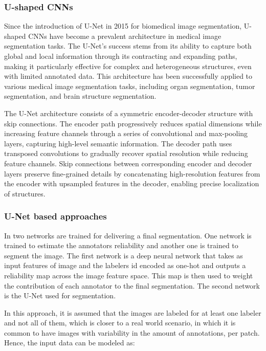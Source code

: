 \subsubsection{U-shaped \gls{CNN}s}
Since the introduction of U-Net \cite{RonnebergerEtAl2015} in 2015
for biomedical image segmentation, U-shaped \gls{CNN}s have become a
prevalent architecture in medical image segmentation tasks. The
U-Net's success stems from its ability to capture both global and
local information through its contracting and expanding paths, making
it particularly effective for complex and heterogeneous structures,
even with limited annotated data. This architecture has been
successfully applied to various medical image segmentation tasks,
including organ segmentation, tumor segmentation, and brain structure
segmentation.

The U-Net architecture consists of a symmetric encoder-decoder
structure with skip connections. The encoder path progressively
reduces spatial dimensions while increasing feature channels through
a series of convolutional and max-pooling layers, capturing
high-level semantic information. The decoder path uses transposed
convolutions to gradually recover spatial resolution while reducing
feature channels. Skip connections between corresponding encoder and
decoder layers preserve fine-grained details by concatenating
high-resolution features from the encoder with upsampled features in
the decoder, enabling precise localization of structures.

\subsubsection{U-Net based approaches}

In \cite{LopezEtAl2024} two networks are trained for delivering a final
segmentation. One network is trained to estimate the annotators reliability
and another one is trained to segment the image. The
first network is a deep neural network that takes as input features of
image and the labelers id encoded as one-hot and outputs a reliability
map across the image feature space. This map is then used to weight
the contribution of each annotator to the final segmentation. The
second network is the U-Net used for segmentation.

In this approach, it is assumed that the images are labeled for at least one
labeler and not all of them, which is closer to a real world scenario, in which
it is common to have images with variability in the amount of
annotations, per patch. Hence, the input data can be modeled as:

